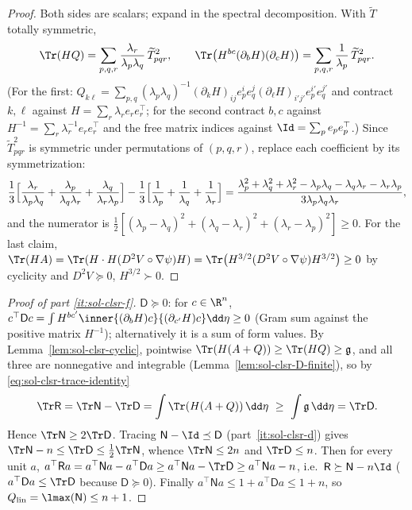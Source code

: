 \documentclass[../main.tex]{subfiles}
\begin{document}
\begin{proof}
Both sides are scalars; expand in the spectral decomposition.  With
$\widetilde T$ totally symmetric,
\[
  \Tr(HQ)=\sum_{p,q,r}\frac{\lambda_r}{\lambda_p\lambda_q}\,\widetilde T_{pqr}^2,
  \qquad
  \Tr\bigl(H^{bc}(\partial_bH)(\partial_cH)\bigr)
  =\sum_{p,q,r}\frac1{\lambda_p}\,\widetilde T_{pqr}^2 .
\]
(For the first: $Q_{k\ell}=\sum_{p,q}(\lambda_p\lambda_q)^{-1}
(\partial_kH)_{ij}e_p^ie_q^j(\partial_\ell H)_{i'j'}e_p^{i'}e_q^{j'}$ and contract $k,\ell$
against $H=\sum_r\lambda_re_re_r^\top$; for the second contract $b,c$ against
$H^{-1}=\sum_r\lambda_r^{-1}e_re_r^\top$ and the free matrix indices against
$\Id=\sum_pe_pe_p^\top$.)  Since $\widetilde T_{pqr}^2$ is symmetric under permutations of
$(p,q,r)$, replace each coefficient by its symmetrization:
\[
  \frac13\Bigl[\frac{\lambda_r}{\lambda_p\lambda_q}+\frac{\lambda_p}{\lambda_q\lambda_r}
  +\frac{\lambda_q}{\lambda_r\lambda_p}\Bigr]
  -\frac13\Bigl[\frac1{\lambda_p}+\frac1{\lambda_q}+\frac1{\lambda_r}\Bigr]
  =\frac{\lambda_p^2+\lambda_q^2+\lambda_r^2-\lambda_p\lambda_q-\lambda_q\lambda_r
  -\lambda_r\lambda_p}{3\lambda_p\lambda_q\lambda_r},
\]
and the numerator is $\tfrac12[(\lambda_p-\lambda_q)^2+(\lambda_q-\lambda_r)^2
+(\lambda_r-\lambda_p)^2]\ge0$.  For the last claim,
$\Tr(HA)=\Tr(H\cdot H(D^2V\circ\nabla\psi)H)=\Tr\bigl(H^{3/2}(D^2V\circ\nabla\psi)H^{3/2}\bigr)\ge0$
by cyclicity and $D^2V\succeq0$, $H^{3/2}\succ0$.
\end{proof}

\begin{proof}[Proof of part \ref{it:sol-clsr-f}]
$\mathsf D\succeq0$: for $c\in\R^n$,
$c^\top\mathsf Dc=\int H^{bc'}\inner{(\partial_bH)c}{(\partial_{c'}H)c}\dd\eta\ge0$ (Gram sum
against the positive matrix $H^{-1}$); alternatively it is a sum of form values.  By
Lemma~\ref{lem:sol-clsr-cyclic}, pointwise
$\Tr(H(A+Q))\ge\Tr(HQ)\ge\mathfrak g$, and all three are nonnegative and integrable
(Lemma~\ref{lem:sol-clsr-D-finite}), so by \eqref{eq:sol-clsr-trace-identity}
\[
  \Tr\mathsf R=\Tr\mathsf N-\Tr\mathsf D=\int\Tr(H(A+Q))\,\dd\eta\ \ge\ \int\mathfrak g\,\dd\eta
  =\Tr\mathsf D .
\]
Hence $\Tr\mathsf N\ge2\Tr\mathsf D$.  Tracing $\mathsf N-\Id\preceq\mathsf D$
(part~\ref{it:sol-clsr-d}) gives $\Tr\mathsf N-n\le\Tr\mathsf D\le\tfrac12\Tr\mathsf N$,
whence $\Tr\mathsf N\le2n$ and $\Tr\mathsf D\le n$.  Then for every unit $a$,
$a^\top\mathsf Ra=a^\top\mathsf Na-a^\top\mathsf Da\ge a^\top\mathsf Na-\Tr\mathsf D
\ge a^\top\mathsf Na-n$, i.e.\ $\mathsf R\succeq\mathsf N-n\Id$
($a^\top\mathsf Da\le\Tr\mathsf D$ because $\mathsf D\succeq0$).  Finally
$a^\top\mathsf Na\le1+a^\top\mathsf Da\le1+n$, so $Q_{\mathrm{lin}}=\lmax(\mathsf N)\le n+1$.
\end{proof}
\end{document}
